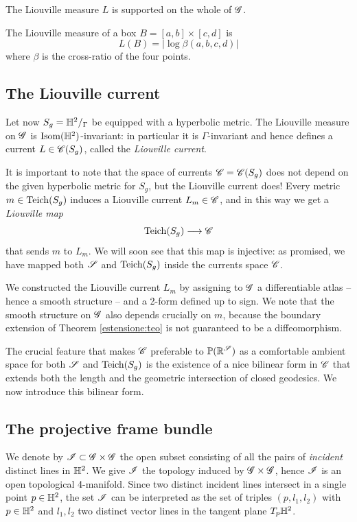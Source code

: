 The Liouville measure $L$ is supported on the whole of $\mathscr{G}$.

\begin{ex}
The Liouville measure of a box $B=[a,b]\times [c,d]$ is 
$$L(B) = \big| \log \beta(a,b,c,d) \big|$$
where $\beta$ is the cross-ratio of the four points.
\end{ex}

\subsection{The Liouville current}
Let now $S_g=\mathbb{H}^2/_\Gamma$ be equipped with a hyperbolic metric. The Liouville measure on $\mathscr{G}$ is ${\rm Isom}(\mathbb{H}^2)$-invariant: in particular it is $\Gamma$-invariant and hence defines a current $L \in \mathscr{C}(S_g)$, called the \emph{Liouville current}. 

It is important to note that the space of currents $\mathscr{C} = \mathscr{C}(S_g)$ does not depend on the given hyperbolic metric for $S_g$, but the Liouville current does! Every metric $m\in {\rm Teich}(S_g)$ induces a Liouville current $L_m\in \mathscr{C}$, and in this way we get a \emph{Liouville map}
$${\rm Teich}(S_g) \longrightarrow \mathscr{C}$$
that sends $m$ to $L_m$.
We will soon see that this map is injective: as promised, we have mapped both $\mathscr{S}$ and ${\rm Teich}(S_g)$ inside the currents space $\mathscr{C}$. 

\begin{rem}
We constructed the Liouville current $L_m$ by assigning to $\mathscr{G}$ a differentiable atlas -- hence a smooth structure -- and a 2-form defined up to sign. We note that the smooth structure on $\mathscr{G}$ also depends crucially on $m$, because the boundary extension of Theorem \ref{estensione:teo} is not guaranteed to be a diffeomorphism.
\end{rem}

The crucial feature that makes $\mathscr{C}$ preferable to $\mathbb{P}(\mathbb{R}^\mathscr{S})$ as a comfortable ambient space for both $\mathscr{S}$ and ${\rm Teich}(S_g)$ is the existence of a nice bilinear form in $\mathscr{C}$ that extends both the length and the geometric intersection of closed geodesics. We now introduce this bilinear form.

\subsection{The projective frame bundle}
We denote by $\mathscr{I} \subset \mathscr{G} \times \mathscr{G}$ the open subset consisting of all the pairs of \emph{incident} distinct lines in $\mathbb{H}^2$. We give $\mathscr{I}$ the topology induced by $\mathscr{G} \times \mathscr{G}$, hence $\mathscr{I}$ is an open topological 4-manifold. Since two distinct incident lines intersect in a single point $p\in\mathbb{H}^2$, the set $\mathscr{I}$ can be interpreted as the set of triples $(p,l_1,l_2)$ with $p\in \mathbb{H}^2$ and $l_1,l_2$ two distinct vector lines in the tangent plane $T_p\mathbb{H}^2$.

